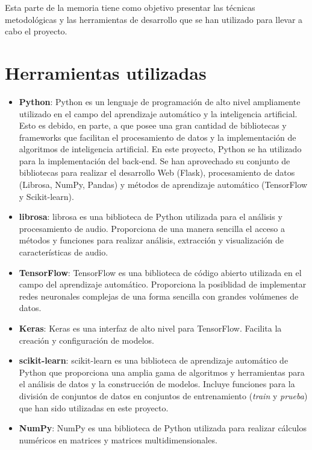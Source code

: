 
Esta parte de la memoria tiene como objetivo presentar las técnicas metodológicas y las herramientas de desarrollo que se han utilizado para llevar a cabo el proyecto.

\section{Herramientas utilizadas}
\begin{itemize}
\tightlist
\item \textbf{Python}: Python es un lenguaje de programación de alto nivel ampliamente utilizado en el campo del aprendizaje automático y la inteligencia artificial. Esto es debido, en parte, a que posee una gran cantidad de bibliotecas y frameworks que facilitan el procesamiento de datos y la implementación de algoritmos de inteligencia artificial.
En este proyecto, Python se ha utilizado para la implementación del back-end. Se han aprovechado su conjunto de bibliotecas para realizar el desarrollo Web (Flask), procesamiento de datos (Librosa, NumPy, Pandas) y métodos de aprendizaje automático (TensorFlow y Scikit-learn).

\item \textbf{librosa}: librosa es una biblioteca de Python utilizada para el análisis y procesamiento de audio. Proporciona de una manera sencilla el acceso a métodos y funciones para realizar análisis, extracción y visualización de características de audio.

\item \textbf{TensorFlow}: TensorFlow es una biblioteca de código abierto utilizada en el campo del aprendizaje automático. Proporciona la posiblidad de implementar redes neuronales complejas de una forma sencilla con grandes volúmenes de datos.

\item \textbf{Keras}: Keras es una interfaz de alto nivel para TensorFlow. Facilita la creación y configuración de modelos.

\item \textbf{scikit-learn}: scikit-learn es una biblioteca de aprendizaje automático de Python que proporciona una amplia gama de algoritmos y herramientas para el análisis de datos y la construcción de modelos. Incluye funciones para la división de conjuntos de datos en conjuntos de entrenamiento (\textit{train} y \textit{prueba}) que han sido utilizadas en este proyecto.

\item \textbf{NumPy}: NumPy es una biblioteca de Python utilizada para realizar cálculos numéricos en matrices y matrices multidimensionales. 


\end{itemize}
